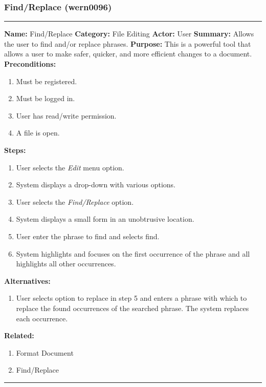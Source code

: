 \documentclass[11pt]{report}
\begin{document}
\subsubsection{Find/Replace (wern0096)}
\vspace{2pt}
\hrule
\vspace{8pt}
	\noindent\textbf{Name:} Find/Replace \newline
	\textbf{Category:} File Editing \newline
	\textbf{Actor:} User \newline
	\textbf{Summary:} Allows the user to find and/or replace phrases. \newline
	\textbf{Purpose:} This is a powerful tool that allows a user to make safer, quicker, and more efficient changes to a document. \newline
	\textbf{Preconditions:}
	\begin{enumerate}
		\item Must be registered.
		\item Must be logged in.
		\item User has read/write permission.
		\item A file is open.
	\end{enumerate}
	\textbf{Steps:}
	\begin{enumerate}
		\item User selects the \textit{Edit} menu option.
		\item System displays a drop-down with various options.
		\item User selects the \textit{Find/Replace} option.
		\item System displays a small form in an unobtrusive location.
		\item User enter the phrase to find and selects find.
		\item System highlights and focuses on the first occurrence of the phrase and all highlights all other occurrences.
	\end{enumerate}
	\textbf{Alternatives:}
	\begin{enumerate}
		\item User selects option to replace in step 5 and enters a phrase with which to replace the found occurrences of the searched phrase. The system replaces each occurrence.
	\end{enumerate}
	\textbf{Related:}
	\begin{enumerate}
		\item Format Document
		\item Find/Replace
	\end{enumerate}
\hrule
\vspace{8pt}
\newpage
\end{document}
